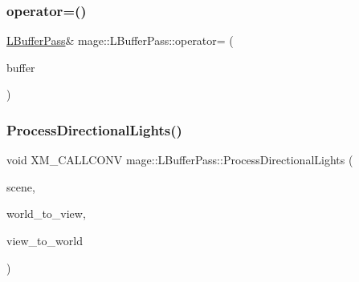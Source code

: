 \hypertarget{classmage_1_1_l_buffer_pass_a3e4405a5af87c2c6f4839cb8502aa5de}{}\label{classmage_1_1_l_buffer_pass_a3e4405a5af87c2c6f4839cb8502aa5de} 
\subsubsection{\texorpdfstring{operator=()}{operator=()}\hspace{0.1cm}{\footnotesize\ttfamily [2/2]}}
{\footnotesize\ttfamily \hyperlink{classmage_1_1_l_buffer_pass}{L\+Buffer\+Pass}\& mage\+::\+L\+Buffer\+Pass\+::operator= (\begin{DoxyParamCaption}\item[{\hyperlink{classmage_1_1_l_buffer_pass}{L\+Buffer\+Pass} \&\&}]{buffer }\end{DoxyParamCaption})\hspace{0.3cm}{\ttfamily [delete]}}

\hypertarget{classmage_1_1_l_buffer_pass_a731613105a25fbae8560954e1b3b78fe}{}\label{classmage_1_1_l_buffer_pass_a731613105a25fbae8560954e1b3b78fe} 
\subsubsection{\texorpdfstring{Process\+Directional\+Lights()}{ProcessDirectionalLights()}}
{\footnotesize\ttfamily void X\+M\+\_\+\+C\+A\+L\+L\+C\+O\+NV mage\+::\+L\+Buffer\+Pass\+::\+Process\+Directional\+Lights (\begin{DoxyParamCaption}\item[{const \hyperlink{classmage_1_1_scene}{Scene} \&}]{scene,  }\item[{F\+X\+M\+M\+A\+T\+R\+IX}]{world\+\_\+to\+\_\+view,  }\item[{C\+X\+M\+M\+A\+T\+R\+IX}]{view\+\_\+to\+\_\+world }\end{DoxyParamCaption})\hspace{0.3cm}{\ttfamily [private]}}

\hypertarget{classmage_1_1_l_buffer_pass_a5da38ff4cf2d1de37fb40f8923b1d9bf}{}\label{classmage_1_1_l_buffer_pass_a5da38ff4cf2d1de37fb40f8923b1d9bf} 
